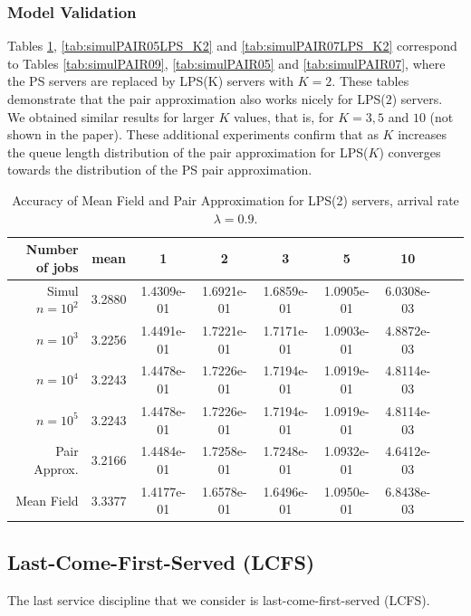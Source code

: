 \documentclass[acmsmall,nonacm]{acmart}
\begin{document}
\subsubsection{Model Validation}
Tables \ref{tab:simulPAIR09LPS_K2}, \ref{tab:simulPAIR05LPS_K2} and \ref{tab:simulPAIR07LPS_K2} correspond to
Tables \ref{tab:simulPAIR09}, \ref{tab:simulPAIR05} and \ref{tab:simulPAIR07}, where the PS servers
are replaced by LPS(K) servers with $K=2$. These tables demonstrate that the pair approximation
also works nicely for LPS($2$) servers. We obtained similar results for larger $K$ values, that is,
for $K=3,5$ and $10$ (not shown in the paper). These additional experiments confirm that as 
$K$ increases the queue length distribution of the pair approximation for LPS($K$) converges towards the distribution of the PS pair approximation.


\begin{table}[t]
    \centering
    \begin{tabular}{|r|c|c|c|c|c|c|c|c|}
    \hline 
        Number of jobs & mean & 1 & 2 & 3 & 5 & 10\\ \hline
         \hline
Simul $n=10^2$&3.2880   &1.4309e-01  & 1.6921e-01  & 1.6859e-01  & 1.0905e-01  & 6.0308e-03\\
$n=10^3$&   3.2256 &  1.4491e-01&   1.7221e-01 &  1.7171e-01&   1.0903e-01&   4.8872e-03\\
$n=10^4$&   3.2243 &  1.4478e-01&   1.7226e-01 &  1.7194e-01&   1.0919e-01&   4.8114e-03\\
$n=10^5$&   3.2243 &  1.4478e-01&   1.7226e-01 &  1.7194e-01&   1.0919e-01&   4.8114e-03\\\hline
Pair Approx.&   3.2166 &  1.4484e-01&   1.7258e-01 &  1.7248e-01&   1.0932e-01&   4.6412e-03\\\hline
Mean Field&   3.3377 &  1.4177e-01&   1.6578e-01&   1.6496e-01&   1.0950e-01&   6.8438e-03\\
         \hline
    \end{tabular}
    \caption{Accuracy of Mean Field and Pair Approximation for LPS(2) servers, arrival rate $\lambda=0.9$. }
    \label{tab:simulPAIR09LPS_K2}
\end{table}


\subsection{Last-Come-First-Served (LCFS)}

The last service discipline that we consider is last-come-first-served (LCFS).
\end{document}
